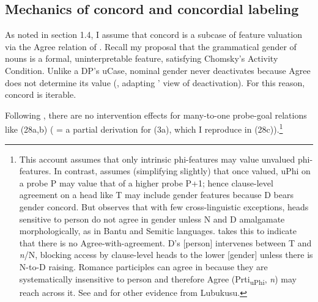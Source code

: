 \documentclass[output=paper
,modfonts
,nonflat]{langsci/langscibook}
\begin{document}
{\subsection{Mechanics of concord and concordial labeling}
As noted in section 1.4, I assume that concord is a subcase of feature valuation via the Agree relation of \citealt{Chomsky2000, Chomsky2001}. Recall my proposal that the grammatical gender of nouns is a formal, uninterpretable feature, satisfying Chomsky's Activity Condition. Unlike a DP's uCase, nominal gender never deactivates because Agree does not determine its value (\citealt{Carstens2010, Carstens2011}, adapting \citealt{Nevins2005}' view of deactivation). For this reason, concord is iterable. 

Following \citet{Hiraiwa2001}, there are no intervention effects for many-to-one probe-goal relations like (28a,b) ( = a partial derivation for (3a), which I reproduce in (28c)).\footnote{This account assumes that only intrinsic phi-features may value unvalued phi-features. In contrast, \citet{Danon2011} assumes (simplifying slightly) that once valued, uPhi on a probe P may value that of a higher probe P+1; hence clause-level agreement on a head like T may include gender features because D bears gender concord. But \citet{Carstens2011} observes that with few cross-linguistic exceptions, heads sensitive to person do not agree in gender unless N and D amalgamate morphologically, as in Bantu and Semitic languages. \citet{Carstens2011} takes this to indicate that there is no Agree-with-agreement. D’s [person] intervenes between T and \textit{n}/N, blocking access by clause-level heads to the lower [gender] unless there is N-to-D raising. Romance participles can agree in because they are systematically insensitive to person and therefore Agree (Prti\textsubscript{uPhi}, \textit{n}) may reach across it. See \citealt{Carstens_Diercks2013b} and \citealt{Wasike2007} for other evidence from Lubukusu.} 

}
\end{document}
